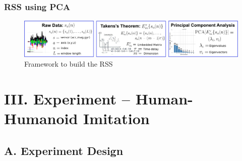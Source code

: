 \documentclass{beamer}
\begin{document}
\begin{frame}
\frametitle{RSS using PCA}
\vspace{-0.7cm}



\begin{figure}[!htb]
\centering
\includegraphics[width=1\textwidth]{method_diagram03}
\caption[PA]{Framework to build the RSS}
 \label{fig:sn}
\end{figure}


\end{frame}








\section{III. Experiment -- Human-Humanoid Imitation}



\subsection{A. Experiment Design}
\end{document}
